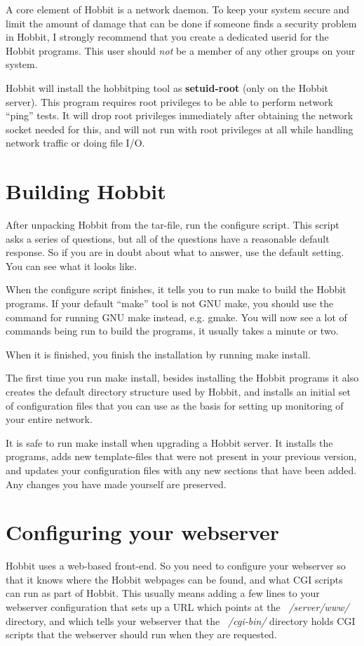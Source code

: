  A core element of Hobbit is a network daemon. To keep your system secure and limit the amount of damage that can be done if someone finds a security problem in Hobbit, I strongly recommend that you create a dedicated userid for the Hobbit programs. This user should \emph{not}
 be a member of any other groups on your system.


 Hobbit will install the hobbitping tool as \textbf{setuid-root}
(only on the Hobbit server). This program requires root privileges to be able to perform network ``ping'' tests. It will drop root privileges immediately after obtaining the network socket needed for this, and will not run with root privileges at all while handling network traffic or doing file I/O. 
\section{Building Hobbit}


 After unpacking Hobbit from the tar-file, run the configure script. This script asks a series of questions, but all of the questions have a reasonable default response. So if you are in doubt about what to answer, use the default setting. You can see what it looks like.


 When the configure script finishes, it tells you to run make to build the Hobbit programs. If your default ``make'' tool is not GNU make, you should use the command for running GNU make instead, e.g. gmake. You will now see a lot of commands being run to build the programs, it usually takes a minute or two.


 When it is finished, you finish the installation by running make install.


 The first time you run make install, besides installing the Hobbit programs it also creates the default directory structure used by Hobbit, and installs an initial set of configuration files that you can use as the basis for setting up monitoring of your entire network.


 It is safe to run make install when upgrading a Hobbit server. It installs the programs, adds new template-files that were not present in your previous version, and updates your configuration files with any new sections that have been added. Any changes you have made yourself are preserved.
\section{Configuring your webserver}


 Hobbit uses a web-based front-end. So you need to configure your webserver so that it knows where the Hobbit webpages can be found, and what CGI scripts can run as part of Hobbit. This usually means adding a few lines to your webserver configuration that sets up a URL which points at the \emph{~/server/www/}
 directory, and which tells your webserver that the \emph{~/cgi-bin/}
 directory holds CGI scripts that the webserver should run when they are requested.



